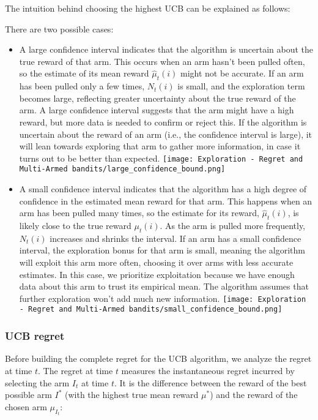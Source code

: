 The intuition behind choosing the highest UCB can be explained as follows:

There are two possible cases:

\begin{itemize}
    \item A large confidence interval indicates that the algorithm is uncertain about the true reward of that arm. This occurs when an arm hasn’t been pulled often, so the estimate of its mean reward $\hat{\mu}_t(i)$ might not be accurate. If an arm has been pulled only a few times, $N_t(i)$ is small, and the exploration term becomes large, reflecting greater uncertainty about the true reward of the arm. A large confidence interval suggests that the arm might have a high reward, but more data is needed to confirm or reject this. If the algorithm is uncertain about the reward of an arm (i.e., the confidence interval is large), it will lean towards exploring that arm to gather more information, in case it turns out to be better than expected. \texttt{[image: Exploration - Regret and Multi-Armed bandits/large\_confidence\_bound.png]}
    \item A small confidence interval indicates that the algorithm has a high degree of confidence in the estimated mean reward for that arm. This happens when an arm has been pulled many times, so the estimate for its reward, $\hat{\mu}_t(i)$, is likely close to the true reward $\mu_t(i)$. As the arm is pulled more frequently, $N_t(i)$ increases and shrinks the interval. If an arm has a small confidence interval, the exploration bonus for that arm is small, meaning the algorithm will exploit this arm more often, choosing it over arms with less accurate estimates. In this case, we prioritize exploitation because we have enough data about this arm to trust its empirical mean. The algorithm assumes that further exploration won’t add much new information. \texttt{[image: Exploration - Regret and Multi-Armed bandits/small\_confidence\_bound.png]}
\end{itemize}


\subsubsection{UCB regret}

Before building the complete regret for the UCB algorithm, we analyze the regret at time $t$. The regret at time $t$ measures the instantaneous regret incurred by selecting the arm $I_t$ at time $t$. It is the difference between the reward of the best possible arm $I^*$ (with the highest true mean reward $\mu^*$) and the reward of the chosen arm $\mu_{I_t}$:

